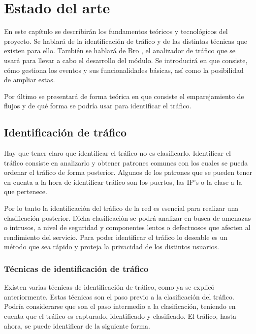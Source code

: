 \chapter{Estado del arte}\label{estadoarte}

En este capítulo se describirán los fundamentos teóricos y tecnológicos del proyecto. Se hablará de la identificación de tráfico y de 
las distintas técnicas que existen para ello. También se hablará de Bro \cite{broindex}, el 
analizador de tráfico que se usará para 
llevar a cabo el desarrollo del módulo. Se introducirá en que consiste, cómo gestiona los eventos y sus 
funcionalidades básicas, así como la posibilidad de ampliar estas.

\intro Por último se presentará de forma teórica en que consiste el emparejamiento de flujos y de qué forma 
se podría usar para identificar el tráfico.

\section{Identificación de tráfico}

Hay que tener claro que identificar el tráfico no es clasificarlo. Identificar el tráfico consiste en analizarlo 
y obtener patrones comunes con los cuales se pueda ordenar el tráfico de forma posterior. Algunos de los patrones 
que se pueden tener en cuenta a la hora de identificar tráfico son los puertos, las IP's o la clase a la que 
pertenece.

\intro Por lo tanto la identificación del tráfico de la red es esencial para realizar una clasificación 
posterior. Dicha clasificación se podrá analizar en busca de amenazas o intrusos, a nivel de seguridad 
y componentes lentos o defectuosos que afecten al rendimiento del servicio. Para poder identificar el 
tráfico lo deseable es un método que sea rápido y proteja la privacidad de los distintos usuarios.

\subsection{Técnicas de identificación de tráfico}

Existen varias técnicas de identificación de tráfico, como ya se explicó anteriormente. Estas técnicas son 
el paso previo a la clasificación del tráfico. Podría considerarse que son el paso intermedio a la clasificación, 
teniendo en cuenta que el tráfico es capturado, identificado y clasificado. El tráfico, hasta ahora, se puede identificar de la siguiente forma.

